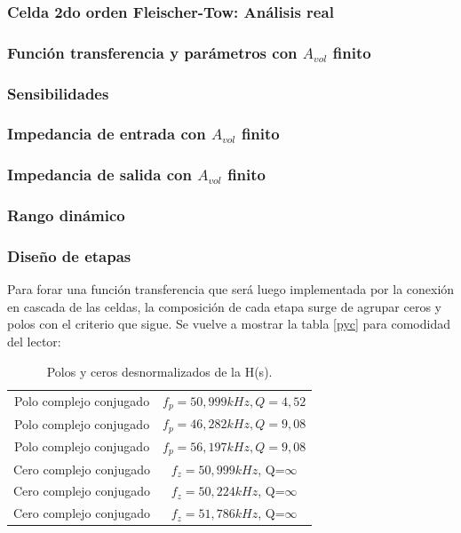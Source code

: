\subsubsection{Celda 2do orden Fleischer-Tow: An\'alisis real}

\subsubsection*{Funci\'on transferencia y par\'ametros con $A_{vol}$ finito}

\subsubsection*{Sensibilidades}

\subsubsection*{Impedancia de entrada con $A_{vol}$ finito}

\subsubsection*{Impedancia de salida con $A_{vol}$ finito}

\subsubsection*{Rango din\'amico}




 \subsubsection{Dise\~no de etapas}

Para forar una funci\'on transferencia que ser\'a luego implementada por la conexi\'on en cascada de las celdas, la composici\'on de cada etapa surge de agrupar ceros y polos con el criterio que sigue. Se vuelve a mostrar la tabla \ref{pyc} para comodidad del lector:

	\begin{table}[H]
	\centering
	\begin{tabular}{c c}
		\hline
		Polo complejo conjugado& $f_p =50,999kHz, Q=4,52$ \\ 
		Polo complejo conjugado &  $f_p=46,282kHz, Q=9,08$\\
		Polo complejo conjugado & $f_p=56,197kHz, Q=9,08$\\
		Cero complejo conjugado & $f_z= 50,999kHz$, Q=$\infty$\\
		Cero complejo conjugado & $f_z= 50,224kHz$, Q=$\infty$\\
		Cero complejo conjugado & $f_z= 51,786kHz$, Q=$\infty$\\
		\hline
	\end{tabular}
	\caption{Polos y ceros desnormalizados de la H(s).}
	\label{pyc2}
\end{table}

